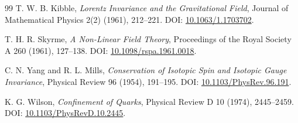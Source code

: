 \documentclass[11pt,a4paper]{article}
\theoremstyle{remark}
\begin{document}
\begin{thebibliography}{99}
T. W. B. Kibble,
\emph{Lorentz Invariance and the Gravitational Field},
Journal of Mathematical Physics 2(2) (1961), 212--221.
DOI: \href{https://doi.org/10.1063/1.1703702}{10.1063/1.1703702}.

T. H. R. Skyrme,
\emph{A Non-Linear Field Theory},
Proceedings of the Royal Society A 260 (1961), 127--138.
DOI: \href{https://doi.org/10.1098/rspa.1961.0018}{10.1098/rspa.1961.0018}.

C. N. Yang and R. L. Mills,
\emph{Conservation of Isotopic Spin and Isotopic Gauge Invariance},
Physical Review 96 (1954), 191--195.
DOI: \href{https://doi.org/10.1103/PhysRev.96.191}{10.1103/PhysRev.96.191}.

K. G. Wilson,
\emph{Confinement of Quarks},
Physical Review D 10 (1974), 2445--2459.
DOI: \href{https://doi.org/10.1103/PhysRevD.10.2445}{10.1103/PhysRevD.10.2445}.

\end{thebibliography}
\fussy
\end{document}
